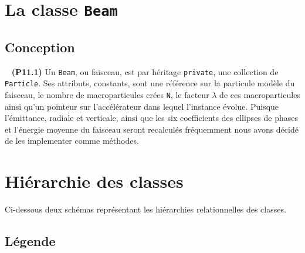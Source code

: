 \documentclass[12pt, letterpaper, twoside]{article}
\newcommand{\T}[1]{\texttt{#1}}
\begin{document}
\section{La classe \T{Beam}}

\subsection{Conception}

\ \linebreak
\noindent \textbf{(P11.1)} Un \T{Beam}, ou faisceau, est par héritage \T{private}, une collection de \T{Particle}. Ses attributs, constants, sont une référence sur la particule modèle du faisceau, le nombre de macroparticules crées \T{N}, le facteur $\lambda$ de ces macroparticules ainsi qu'un pointeur sur l'accélérateur dans lequel l'instance évolue. Puisque l'émittance, radiale et verticale, ainsi que les six coefficients des ellipses de phases et l'énergie moyenne du faisceau seront recalculés fréquemment nous avons décidé de les implementer comme méthodes. 

\newpage
\section{Hiérarchie des classes}\noindent
Ci-dessous deux schémas représentant les hiérarchies relationnelles des classes.

\subsection{Légende}
\end{document}
